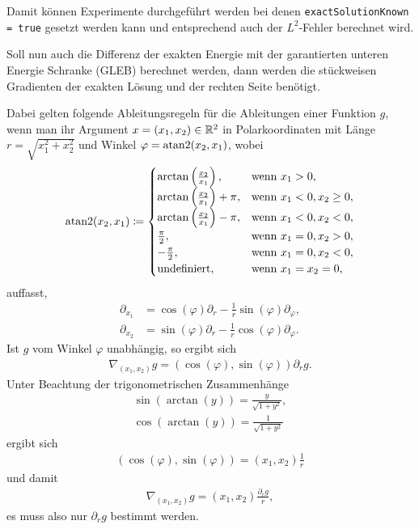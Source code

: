 Damit können Experimente durchgeführt werden bei denen 
\texttt{exactSolutionKnown = true} gesetzt werden kann und entsprechend auch 
der $L^2$-Fehler berechnet wird.

Soll nun auch die Differenz der exakten Energie mit der garantierten unteren 
Energie Schranke (GLEB) berechnet werden, dann werden die stückweisen
Gradienten der exakten Lösung und der rechten Seite benötigt.

Dabei gelten folgende Ableitungsregeln für die Ableitungen einer Funktion 
$g$, wenn man ihr Argument $x=(x_1,x_2)\in\mathbb{R}^2$ in Polarkoordinaten mit Länge
$r=\sqrt{x_1^2+x_2^2}$ und Winkel
$\varphi = \operatorname{atan2}(x_2,x_1)$, wobei 
\begin{align*}
  \operatorname{atan2}(x_2,x_1)\coloneqq
  \begin{cases}
    \arctan\left( \frac{x_2}{x_1} \right),& \text{wenn }x_1>0,\\
    \arctan\left( \frac{x_2}{x_1} \right) +\pi,& \text{wenn }x_1<0,x_2\geq 0,\\
    \arctan\left( \frac{x_2}{x_1} \right) -\pi,& \text{wenn }x_1<0,x_2<0,\\
    \frac{\pi}{2},& \text{wenn }x_1=0,x_2>0,\\
    -\frac{\pi}{2},& \text{wenn }x_1=0,x_2<0,\\
    \text{undefiniert},& \text{wenn }x_1=x_2=0,\\
  \end{cases}
\end{align*}
auffasst,
\begin{align*}
  \partial_{x_1} &= 
  \cos(\varphi)\partial_r - \frac{1}{r}\sin(\varphi)\partial_\varphi,\\
  \partial_{x_2} &= 
  \sin(\varphi)\partial_r - \frac{1}{r}\cos(\varphi)\partial_\varphi.
\end{align*}
Ist $g$ vom Winkel $\varphi$ unabhängig, so ergibt sich
\begin{align*}
  \nabla_{(x_1,x_2)}g = (\cos(\varphi),\sin(\varphi))\partial_r g.
\end{align*}
Unter Beachtung der trigonometrischen Zusammenhänge
\begin{align*}
  \sin(\arctan(y)) = \frac{y}{\sqrt{1+y^2}},\\
  \cos(\arctan(y)) = \frac{1}{\sqrt{1+y^2}}
\end{align*}
ergibt sich 
\begin{align*}
  (\cos(\varphi),\sin(\varphi)) = (x_1,x_2)\frac{1}{r}
\end{align*}
und damit 
\begin{align*}
  \nabla_{(x_1,x_2)}g = (x_1,x_2)\frac{\partial_r g}{r},
\end{align*} 
es muss also nur $\partial_r g$ bestimmt werden.

